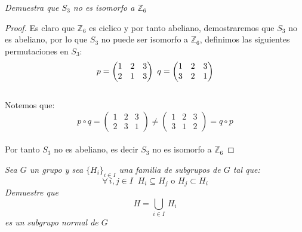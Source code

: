 \documentclass[11pt,letterpaper]{article}
\newcommand{\Z}{\mathbb{Z}}
\begin{document}
\begin{tcolorbox}[
	title = \textcolor{black}{\textcolor{white}{Problema 2}},]
\textit{Demuestra que $S_3$ no es isomorfo a $\Z_6$
}
\end{tcolorbox}
\begin{proof}
    Es claro que $\Z_6$ es ciclico y por tanto abeliano, demostraremos que $S_3$ no es abeliano, por lo que $S_3$ no puede ser isomorfo a $\Z_6$, definimos las siguientes permutaciones en $S_3$:
    \begin{equation*}
        p=\begin{pmatrix}
            1&2&3\\
            2&1&3
        \end{pmatrix}\,\\
        \,\\\,\,
        q=\begin{pmatrix}
            1&2&3\\
            3&2&1
        \end{pmatrix}
    \end{equation*}\,\\
    Notemos que:\,\\
    \begin{equation*}
        p\circ q=\begin{pmatrix}
            1&2&3\\
            2&3&1
        \end{pmatrix}\neq \begin{pmatrix}
            1&2&3\\
            3&1&2
        \end{pmatrix}=q\circ p
    \end{equation*}\,\\
    Por tanto $S_3$ no es abeliano, es decir $S_3$ no es isomorfo a $\Z_6$
\end{proof}
\begin{tcolorbox}[
	title = \textcolor{black}{\textcolor{white}{Problema 3}},]
\textit{Sea $G$ un grupo y sea $\{H_i\}_{i\in I}$ una familia de subgrupos de $G$ tal que:
\begin{equation*}
    \forall\,i,j\in I\,\,\:H_i\subseteq H_j\,\,\text{o}\,\,H_j\subset H_i
\end{equation*}
Demuestre que\,\\
\begin{equation*}
    H=\bigcup_{i\in I}\,H_i
\end{equation*}
es un subgrupo normal de $G$}
\end{tcolorbox}
\end{document}

